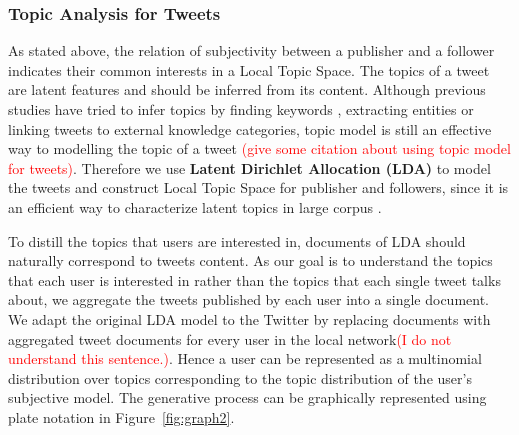 \documentclass{acm_proc_article-sp}
\newcommand{\mo}[1]{\textcolor{red}{#1}}
\begin{document}
\subsubsection{Topic Analysis for Tweets}
\label{local}
As stated above, the relation of subjectivity between a publisher and a follower indicates their common interests in a Local Topic Space. 
The topics of a tweet are latent features and should be inferred from its content.
Although previous studies have tried to infer topics by finding keywords \cite{Chen:2010STE}, extracting  entities \cite{Abel:2011AUM} or linking tweets to external knowledge categories\cite{conf/icwsm/MacskassyM11},  topic model is still an effective way to modelling the topic of a tweet \mo{(give some citation about using topic model for tweets)}. Therefore we use \textbf{Latent Dirichlet Allocation (LDA)} to model the tweets and construct Local Topic Space for publisher and followers, since it is an efficient way to characterize latent topics in large corpus \cite{blei2003latent,conf/wsdm/WengLJH10}. 


To distill the topics that users are interested in, documents of LDA should naturally correspond to tweets content. 
As our goal is to understand the topics that each user is interested in rather than the topics that each single tweet talks about, we aggregate the tweets published by each user into a single document. 
We adapt the original LDA model to the Twitter by replacing documents with aggregated tweet documents for every user in the local network\mo{(I do not understand this sentence.)}. 
Hence a user can be represented as a multinomial distribution over topics corresponding to the topic distribution of the user's subjective model.
The generative process can be graphically represented using plate notation in Figure~\ref{fig:graph2}. 
\end{document}
